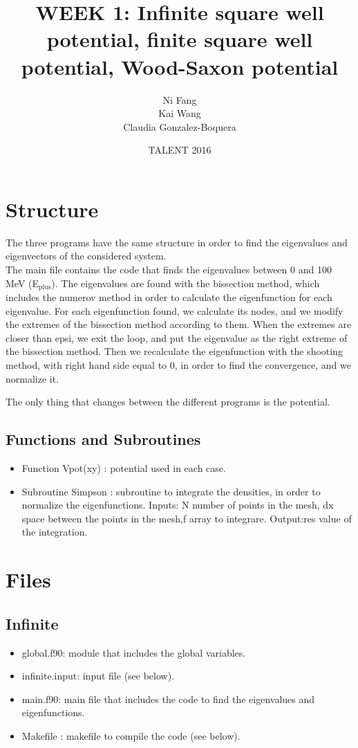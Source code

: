 \documentclass[a4paper,10pt]{article}
\title{WEEK 1: Infinite square well potential, finite square well potential, Wood-Saxon potential}
\author{Ni Fang\\ Kai Wang\\Claudia Gonzalez-Boquera}
\date{TALENT 2016}
\begin{document}
\maketitle
\section{Structure}
The three programs have the same structure in order to find the eigenvalues and eigenvectors 
of the considered system. \\
The main file contains the code that finds the eigenvalues between 0 and 100 MeV (E$_\mathrm{plus}$).
The eigenvalues are found with the bissection method, which includes the numerov 
method in order to calculate the eigenfunction for each eigenvalue. For each
eigenfunction found, we calculate its nodes, and we modify the extremes of the 
bissection method according to them. When the extremes are closer than epsi,
we exit the loop, and put the eigenvalue as the right extreme of the bissection
method. 
Then we recalculate the eigenfunction with the shooting method, with 
right hand side equal to 0, in order to find the convergence, and we normalize it. 

The only thing that changes between the different programs is the potential.
\subsection{Functions and Subroutines}
\begin{itemize}
 \item Function Vpot(xy) :  potential used in each case.
 \item Subroutine Simpson : subroutine to integrate the densities, in order to normalize the 
eigenfunctions. Inputs: N number of points in the mesh, dx space between the points in the mesh,f array
to integrare. Output:res  value of the integration. 
\end{itemize}

\section{Files}
\subsection{Infinite}
\begin{itemize}
 \item global.f90: module that includes the global variables. 
 \item infinite.input: input file (see below).
 \item main.f90: main file that includes the code to find the eigenvalues and eigenfunctions. 
 \item Makefile : makefile to compile the code (see below). 
\end{itemize}
\end{document}

